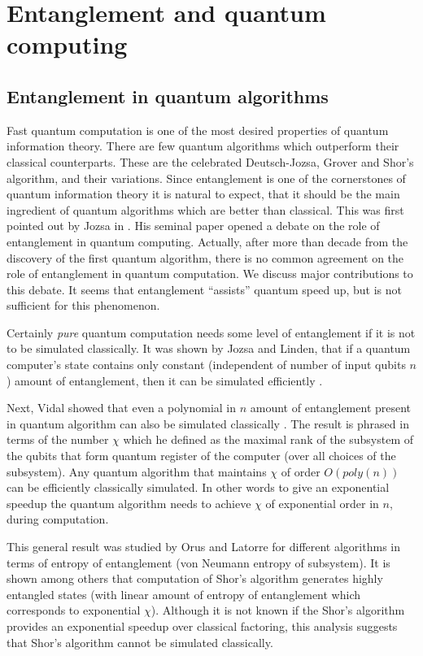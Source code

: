 \documentclass[rmp,12pt,preprint]{revtex4-2}
\begin{document}
\section{Entanglement and quantum computing}


\subsection{Entanglement in quantum algorithms}

Fast quantum computation is one of the most desired properties of
quantum information theory. There are few quantum algorithms which
outperform their classical counterparts. These are the celebrated
Deutsch-Jozsa, Grover and Shor's algorithm, and their variations.
Since entanglement is one of the cornerstones of quantum information
theory it is natural to expect, that it should be the main
ingredient of quantum algorithms which are better than classical.
This was first pointed out by Jozsa in \cite{Jozsa_ent_qc_first}.
His seminal paper opened a debate on the role of entanglement in
quantum computing. Actually, after more than decade from the
discovery of the first quantum algorithm, there is no common
agreement on the role of entanglement in quantum computation. We
discuss major contributions to this debate. It seems that
entanglement ``assists'' quantum speed up, but is not sufficient for
this phenomenon.

Certainly {\it pure} quantum computation needs some level of
entanglement if it is not to be simulated classically. It was shown
by Jozsa and Linden, that if a quantum computer's state contains
only constant (independent of number of input qubits $n$) amount of
entanglement, then it can be simulated efficiently
\cite{JozsaLinden}.

Next, Vidal showed  that even a polynomial in $n$ amount of
entanglement present in quantum algorithm can also be simulated
classically \cite{Vidal}. The result is phrased in terms of the
number $\chi$ which he defined as the maximal rank of the subsystem
of the qubits that form quantum register of the computer (over all
choices of the subsystem). Any quantum algorithm that maintains
$\chi$ of order $O(poly(n))$ can be efficiently classically
simulated. In other words to give an exponential speedup the quantum
algorithm needs to achieve $\chi$ of exponential order in $n$,
during computation.

This general result was studied by Orus and Latorre
\cite{OrusLatorre} for different algorithms in terms of entropy of
entanglement (von Neumann entropy of subsystem). It is shown among
others that computation of Shor's algorithm generates highly
entangled states (with linear amount of entropy of entanglement
which corresponds to exponential $\chi$). Although it is not known
if the Shor's algorithm provides an exponential speedup over
classical factoring, this analysis suggests that Shor's algorithm
cannot be simulated classically.
\end{document}
